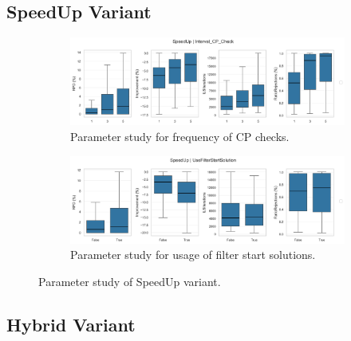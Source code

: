 \subsection{SpeedUp Variant}
\label{app:subsec:parameterstudy_SpeedUp}

\begin{figure}[!ht]
	\centering
	\begin{subfigure}[t]{\textwidth}
		\centering
		\includegraphics[width=\linewidth]{pictures/parameter_study/Interval_CP_Check_SpeedUp_parameter_study.png}
		\caption{Parameter study for frequency of CP checks.}
	\end{subfigure}
	\begin{subfigure}[t]{\textwidth}
		\centering
		\includegraphics[width=\linewidth]{pictures/parameter_study/UseFilterStartSolution_SpeedUp_parameter_study.png}
		\caption{Parameter study for usage of filter start solutions.}
	\end{subfigure}
	\caption{Parameter study of SpeedUp variant.}
\end{figure}

\clearpage
\subsection{Hybrid Variant}
\label{app:subsec:parameterstudy_Hybrid}

